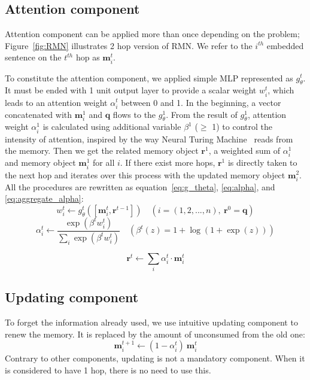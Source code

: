 \documentclass{article} \usepackage{iclr2018_conference,times}
\renewcommand{\vec}[1]{\mathbf{#1}}
\begin{document}
\subsection{Attention component} 
Attention component can be applied more than once depending on the problem; Figure~\ref{fig:RMN} illustrates 2 hop version of RMN.
We refer to the $i^{th}$ embedded sentence on the $t^{th}$ hop as $\vec{m}_i^t$.


To constitute the attention component, we applied simple MLP represented as $g_\theta^t$.
It must be ended with 1 unit output layer to provide a scalar weight $w_i^t$, which leads to an attention weight $\alpha_i^t$ between 0 and 1.
In the beginning, a vector concatenated with $\vec{m}_i^1$ and $\vec{q}$ flows to the $g_\theta^1$.
From the result of $g_\theta^1$, attention weight $\alpha_i^1$ is calculated using additional variable $\beta^1$ ($\geq$ 1) to control the intensity of attention, inspired by the way Neural Turing Machine~\citep{graves2014neural} reads from the memory.
Then we get the related memory object $\vec{r}^1$, a weighted sum of $\alpha_i^1$ and memory object $\vec{m}_i^1$ for all $i$.
If there exist more hops, $\vec{r}^1$ is directly taken to the next hop and iterates over this process with the updated memory object $\vec{m}_i^2$.
All the procedures are rewritten as equation~\ref{eq:g_theta}, \ref{eq:alpha}, and \ref{eq:aggregate_alpha}:
\begin{equation}\label{eq:g_theta}
w_i^t \leftarrow g_\theta^t ([\vec{m}_i^t, \vec{r}^{t-1}]) \quad (i = (1, 2, ..., n),\ \vec{r}^0 = \vec{q})
\end{equation}
\begin{equation}\label{eq:alpha}
\alpha_i^t \leftarrow \frac{\exp (\beta^t w_i^t)}{\sum_i \exp (\beta^t w_i^t)} \quad (\beta^t(z) = 1 + \log(1 + \exp(z)))
\end{equation}

\begin{equation}\label{eq:aggregate_alpha}
\vec{r}^{t} \leftarrow \sum_i \alpha_i^t \cdot \vec{m}_i^t
\end{equation}

\subsection{Updating component} 
To forget the information already used, we use intuitive updating component to renew the memory.
It is replaced by the amount of unconsumed from the old one:
\begin{equation}\label{eq:update}
\vec{m}_i^{t+1} \leftarrow (1 - \alpha_i^t )\ \vec{m}_i^t
\end{equation}
Contrary to other components, updating is not a mandatory component.
When it is considered to have 1 hop, there is no need to use this.
\end{document}

